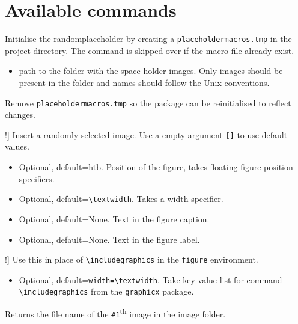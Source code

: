 \documentclass[12pt]{article}
\begin{document}
    \section{Available commands}
    \begin{description}
        \item[\lstinline!\placeholderinit{#1}!] 
        Initialise the randomplaceholder by creating a \linebreak \lstinline!placeholdermacros.tmp! in the project directory. The command is skipped over if the macro file already exist.
            \begin{itemize}
                \item[\lstinline!#1!] path to the folder with the space holder images. Only images should be present in the folder and names should follow the Unix conventions.
            \end{itemize}
        \item[\lstinline!\placeholderclean!] Remove \lstinline!placeholdermacros.tmp! so the package can be reinitialised to reflect changes. 
        \item[\lstinline!\placeholder[#1][#2][#3][#4]!] Insert a randomly selected image. Use a empty argument \lstinline{[]} to use default values.
            \begin{itemize}
                \item[\lstinline{#1}] Optional, default=htb. Position of the figure, takes floating figure position specifiers.
                \item[\lstinline{#2}] Optional, default=\lstinline{\textwidth}. Takes a width specifier.
                \item[\lstinline{#3}] Optional, default=None. Text in the figure caption.
                \item[\lstinline{#4}] Optional, default=None. Text in the figure label.  
            \end{itemize}
        \item[\lstinline!\includeplaceholder[#1]!] Use this in place of \lstinline!\includegraphics! in the \lstinline{figure} environment.
            \begin{itemize}
                \item[\lstinline{#1}] Optional, default=\lstinline{width=\textwidth}. Take key-value list for command \lstinline{\includegraphics} from the \lstinline{graphicx} package.
            \end{itemize}
        \item[\lstinline!\placeholderimage{#1}!] Returns the file name of the \lstinline{#1}\textsuperscript{th} image in the image folder. 
    \end{description}
\end{document}
